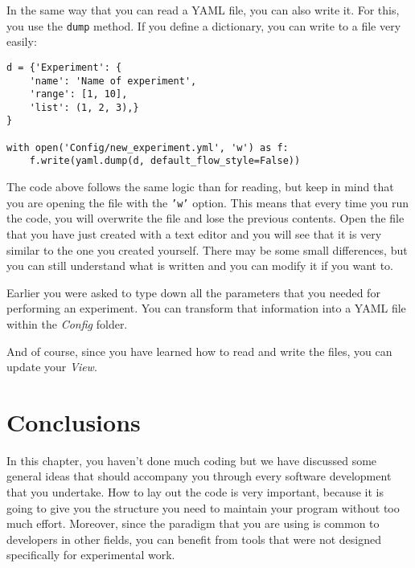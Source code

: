 
In the same way that you can read a {YAML} file, you can also write it.
For this, you use the \texttt{dump} method. If you define a dictionary,
you can write to a file very easily:

\begin{verbatim}
d = {'Experiment': {
    'name': 'Name of experiment',
    'range': [1, 10],
    'list': (1, 2, 3),}
}

with open('Config/new_experiment.yml', 'w') as f:
    f.write(yaml.dump(d, default_flow_style=False))
\end{verbatim}

The code above follows the same logic than for reading, but keep in mind
that you are opening the file with the
\texttt{'w'} option. This means that
every time you run the code, you will overwrite the file and lose the
previous contents. Open the file that you have just created with a text
editor and you will see that it is very similar to the one you created
yourself. There may be some small differences, but you can still
understand what is written and you can modify it if you want to.


Earlier you were asked to type down all the parameters that you needed
for performing an experiment. You can transform that information into a
{YAML} file within the \emph{Config} folder.


And of course, since you have learned how to read and write the files,
you can update your \emph{View}.


\section{Conclusions}\label{conclusions}

In this chapter, you haven't done much coding but we have discussed some
general ideas that should accompany you through every software
development that you undertake. How to lay out the code is very
important, because it is going to give you the structure you need to
maintain your program without too much effort. Moreover, since the paradigm that you are using is common to developers in other fields, you
can benefit from tools that were not designed specifically for
experimental work.

